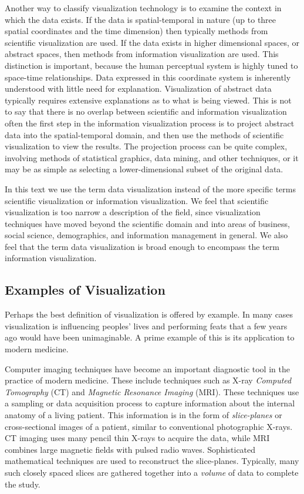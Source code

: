 Another way to classify visualization technology is to examine the context in which the data exists. If the data is spatial-temporal in nature (up to three spatial coordinates and the time dimension) then typically methods from scientific visualization are used. If the data exists in higher dimensional spaces, or abstract spaces, then methods from information visualization are used.
This distinction is important, because the human perceptual system is highly tuned to space-time relationships.
Data expressed in this coordinate system is inherently understood with little need for explanation. Visualization of abstract data typically requires extensive explanations as to what is being viewed. This is not to say that there is no overlap between scientific and information visualization often the first step in the information visualization process is to project abstract data into the spatial-temporal domain, and then use the methods of scientific visualization to view the results. The projection process can be quite complex, involving methods of statistical graphics, data
mining, and other techniques, or it may be as simple as selecting a lower-dimensional subset of the original data.

In this text we use the term data visualization instead of the more specific terms scientific visualization or information visualization. We feel that scientific visualization is too narrow a description of the field, since visualization techniques have moved beyond the scientific domain and into areas of business, social science, demographics, and information management in general.
We also feel that the term data visualization is broad enough to encompass the term information visualization.

\subsection{Examples of Visualization}
Perhaps the best definition of visualization is offered by example. In many cases visualization is influencing peoples' lives and performing feats that a few years ago would have been unimaginable. A prime example of this is its application to modern medicine.

Computer imaging techniques have become an important diagnostic tool in the practice of modern medicine. These include techniques such as X-ray \emph{Computed Tomography} (CT) and \emph{Magnetic Resonance Imaging} (MRI). These techniques use a sampling or data acquisition process to capture information about the internal anatomy of a living patient. This information is in the form of \emph{slice-planes} or cross-sectional images of a patient, similar to conventional photographic X-rays. CT imaging uses many pencil thin X-rays to acquire the data, while MRI combines large magnetic fields with pulsed radio waves. Sophisticated mathematical techniques are used to reconstruct the slice-planes. Typically, many such closely spaced slices are gathered together into a \emph{volume} of data to complete the study.

